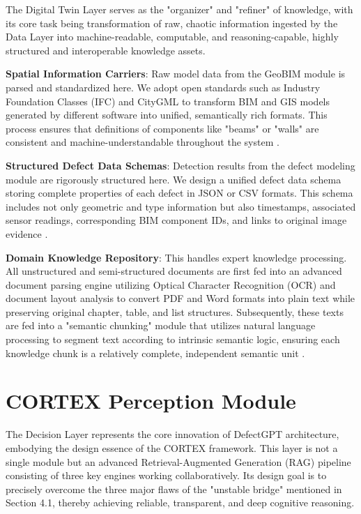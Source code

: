 The Digital Twin Layer serves as the "organizer" and "refiner" of knowledge, with its core task being transformation of raw, chaotic information ingested by the Data Layer into machine-readable, computable, and reasoning-capable, highly structured and interoperable knowledge assets.

\textbf{Spatial Information Carriers}: Raw model data from the GeoBIM module is parsed and standardized here. We adopt open standards such as Industry Foundation Classes (IFC) and CityGML to transform BIM and GIS models generated by different software into unified, semantically rich formats. This process ensures that definitions of components like "beams" or "walls" are consistent and machine-understandable throughout the system \cite{tang2019retrieving}.

\textbf{Structured Defect Data Schemas}: Detection results from the defect modeling module are rigorously structured here. We design a unified defect data schema storing complete properties of each defect in JSON or CSV formats. This schema includes not only geometric and type information but also timestamps, associated sensor readings, corresponding BIM component IDs, and links to original image evidence \cite{li2024single}.

\textbf{Domain Knowledge Repository}: This handles expert knowledge processing. All unstructured and semi-structured documents are first fed into an advanced document parsing engine utilizing Optical Character Recognition (OCR) and document layout analysis to convert PDF and Word formats into plain text while preserving original chapter, table, and list structures. Subsequently, these texts are fed into a "semantic chunking" module that utilizes natural language processing to segment text according to intrinsic semantic logic, ensuring each knowledge chunk is a relatively complete, independent semantic unit \cite{fan2023retrieval}.

\section{CORTEX Perception Module}

The Decision Layer represents the core innovation of DefectGPT architecture, embodying the design essence of the CORTEX framework. This layer is not a single module but an advanced Retrieval-Augmented Generation (RAG) pipeline consisting of three key engines working collaboratively. Its design goal is to precisely overcome the three major flaws of the "unstable bridge" mentioned in Section 4.1, thereby achieving reliable, transparent, and deep cognitive reasoning.

